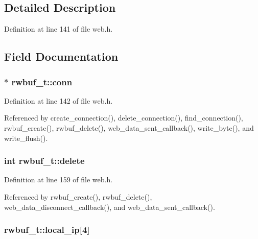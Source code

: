 \subsection{Detailed Description}


Definition at line 141 of file web.\+h.



\subsection{Field Documentation}
\subsubsection[{\texorpdfstring{conn}{conn}}]{$\ast$ rwbuf\+\_\+t\+::conn}\hypertarget{structrwbuf__t_a15785240e32c27f7af7c4b0cb1a6e39b}{}\label{structrwbuf__t_a15785240e32c27f7af7c4b0cb1a6e39b}


Definition at line 142 of file web.\+h.



Referenced by create\+\_\+connection(), delete\+\_\+connection(), find\+\_\+connection(), rwbuf\+\_\+create(), rwbuf\+\_\+delete(), web\+\_\+data\+\_\+sent\+\_\+callback(), write\+\_\+byte(), and write\+\_\+flush().

\subsubsection[{\texorpdfstring{delete}{delete}}]{\setlength{\rightskip}{0pt plus 5cm}int rwbuf\+\_\+t\+::delete}\hypertarget{structrwbuf__t_a54e278f96a331cf0a61d22094c4b9f87}{}\label{structrwbuf__t_a54e278f96a331cf0a61d22094c4b9f87}


Definition at line 159 of file web.\+h.



Referenced by rwbuf\+\_\+create(), rwbuf\+\_\+delete(), web\+\_\+data\+\_\+disconnect\+\_\+callback(), and web\+\_\+data\+\_\+sent\+\_\+callback().

\subsubsection[{\texorpdfstring{local\+\_\+ip}{local_ip}}]{ rwbuf\+\_\+t\+::local\+\_\+ip\mbox{[}4\mbox{]}}\hypertarget{structrwbuf__t_aa26b4813db79aeaa293bb1eadfde0b54}{}\label{structrwbuf__t_aa26b4813db79aeaa293bb1eadfde0b54}


